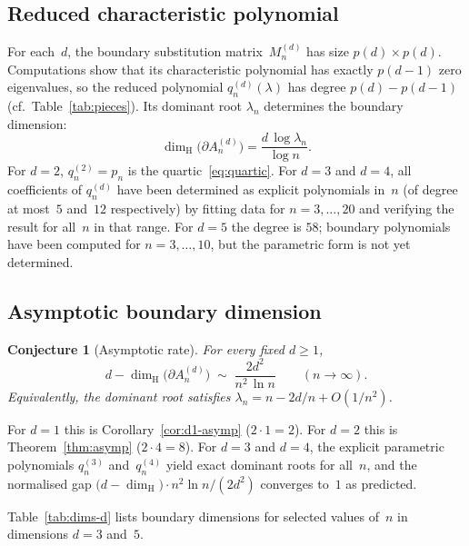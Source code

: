 \documentclass{amsart}
\newtheorem{conjecture}[theorem]{Conjecture}
\theoremstyle{definition}
\theoremstyle{remark}
\newcommand{\dH}{\dim_{\mathrm{H}}}
\begin{document}
\subsection{Reduced characteristic polynomial}
\label{ssec:charpoly-d}

For each~$d$, the boundary substitution matrix~$M_n^{(d)}$ has size
$p(d) \times p(d)$.  Computations show that its characteristic
polynomial has exactly $p(d{-}1)$ zero eigenvalues, so the reduced
polynomial $q_n^{(d)}(\lambda)$ has degree $p(d) - p(d{-}1)$
(cf.\ Table~\ref{tab:pieces}).
Its dominant root $\lambda_n$ determines the boundary dimension:
\begin{equation}\label{eq:dim-d}
  \dH\bigl(\partial A_n^{(d)}\bigr)
  = \frac{d\,\log\lambda_n}{\log n}.
\end{equation}
For $d = 2$, $q_n^{(2)} = p_n$ is the quartic~\eqref{eq:quartic}.
For $d = 3$ and $d = 4$, all coefficients of $q_n^{(d)}$ have
been determined as explicit polynomials in~$n$ (of degree at
most~$5$ and~$12$ respectively) by fitting data for $n = 3,
\ldots, 20$ and verifying the result for all~$n$ in that range.
For $d = 5$ the degree is $58$; boundary polynomials have been
computed for $n = 3, \ldots, 10$, but the parametric form is
not yet determined.

\subsection{Asymptotic boundary dimension}

\begin{conjecture}[Asymptotic rate]\label{conj:asymp-d}
For every fixed $d \ge 1$,
\begin{equation}\label{eq:asymp-d}
  d - \dH\bigl(\partial A_n^{(d)}\bigr)
  \;\sim\; \frac{2d^2}{n^2\,\ln n}
  \qquad (n \to \infty).
\end{equation}
Equivalently, the dominant root satisfies
$\lambda_n = n - 2d/n + O(1/n^2)$.
\end{conjecture}

For $d = 1$ this is Corollary~\ref{cor:d1-asymp} ($2 \cdot 1 = 2$).
For $d = 2$ this is Theorem~\ref{thm:asymp} ($2 \cdot 4 = 8$).
For $d = 3$ and $d = 4$, the explicit parametric polynomials
$q_n^{(3)}$ and~$q_n^{(4)}$ yield exact dominant roots for all~$n$,
and the normalised gap
$\bigl(d - \dH\bigr) \cdot n^2 \ln n / (2d^2)$ converges to~$1$
as predicted.

Table~\ref{tab:dims-d} lists boundary dimensions for selected
values of~$n$ in dimensions $d = 3$ and~$5$.
\end{document}
